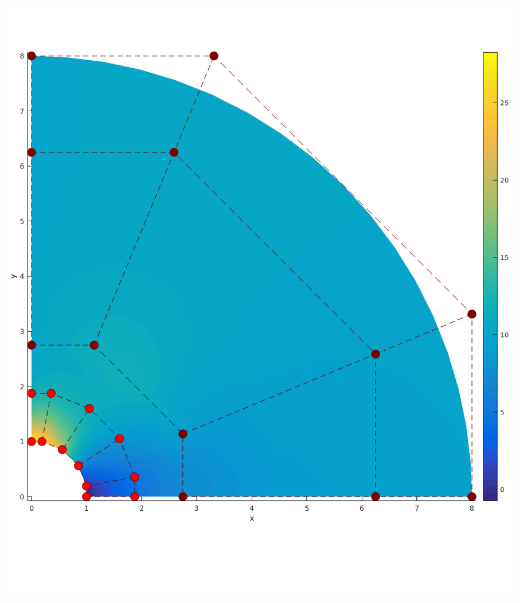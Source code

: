 \documentclass{beamer}
\begin{document}
\begin{frame}
\begin{minipage}{0.49\textwidth}
		\includegraphics[scale=0.24]{pics/plateWithAHole/plate_controlnet_2.png}
	\end{minipage}
\end{frame}
\end{document}
